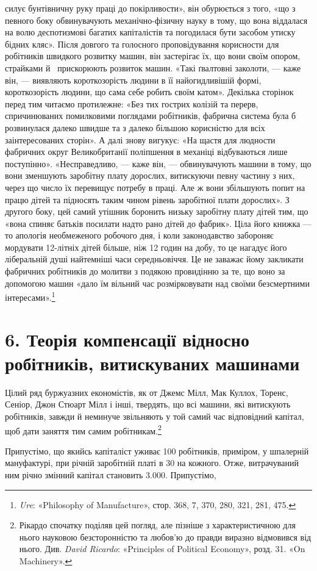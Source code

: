 \parcont{}  %
силує бунтівничну руку праці до покірливости», він обурюється
з того, «що з певного боку обвинувачують механічно-фізичну
науку в тому, що вона віддалася на волю деспотизмові багатих
капіталістів та погодилася бути засобом утиску бідних кляс».
Після довгого та голосного проповідування корисности для робітників
швидкого розвитку машин, він застерігає їх, що вони своїм
опором, страйками й~ прискорюють розвиток машин. «Такі
ґвалтовні заколоти, — каже він, — виявляють короткозорість людини
в її найогидливішій формі, короткозорість людини, що сама
себе робить своїм катом». Декілька сторінок перед тим читаємо
протилежне: «Без тих гострих колізій та перерв, спричинюваних
помилковими поглядами робітників, фабрична система була б
розвинулася далеко швидше та з далеко більшою корисністю
для всіх заінтересованих сторін». А далі знову вигукує: «На
щастя для людности фабричних округ Великобританії поліпшення
в механіці відбуваються лише поступінно». «Несправедливо, —
каже він, — обвинувачують машини в тому, що вони зменшують
заробітну плату дорослих, витискуючи певну частину з них, через
що число їх перевищує потребу в праці. Але ж вони збільшують
попит на працю дітей та підносять таким чином рівень заробітної
плати дорослих». З другого боку, цей самий утішник боронить
низьку заробітну плату дітей тим, що «вона спиняє батьків посилати
надто рано дітей до фабрик». Ціла його книжка — то апологія
необмеженого робочого дня, і коли законодавство забороняє
мордувати 12-літніх дітей більше, ніж 12 годин на добу, то це
нагадує його ліберальній душі найтемніші часи середньовіччя.
Це не заважає йому закликати фабричних робітників до молитви
з подякою провидінню за те, що воно за допомогою машин
«дало їм вільний час розмірковувати над своїми безсмертними
інтересами».\footnote{
\emph{Ure}: «Philosophy of Manufacture», стор. 368, 7, 370, 280, 321, 281, 475.
}

\section*{6. Теорія компенсації відносно робітників, витискуваних
машинами}

Цілий ряд буржуазних економістів, як от Джемс Мілл, Мак
Куллох, Торенс, Сеніор, Джон Стюарт Мілл і інші, твердять,
що всі машини, які витискують робітників, завжди й неминуче
звільняють у той самий час відповідний капітал, щоб дати заняття
тим самим робітникам.\footnote{
Рікардо спочатку поділяв цей погляд, але пізніше з характеристичною
для нього науковою безсторонністю та любов’ю до правди виразно
відмовився від нього. Див. \emph{David Ricardo}: «Principles of Political
Economy», розд. 31. «On Machinery».
}

Припустімо, що якийсь капіталіст уживає 100 робітників,
приміром, у шпалерній мануфактурі, при річній заробітній платі
в 30 на кожного. Отже, витрачуваний ним річно
змінний капітал становить \num{3.000}. Припустімо,
\parbreak{}  %
